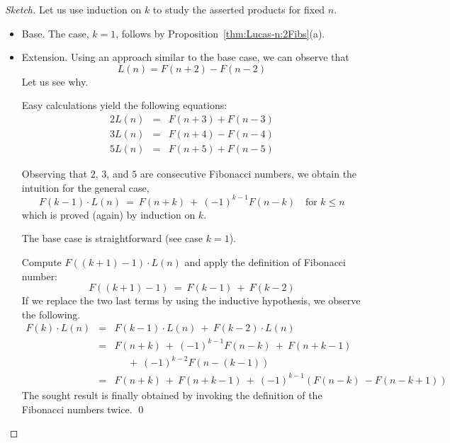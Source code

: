 \begin{proof}[Sketch]
Let us use induction on $k$ to study the asserted products for fixed $n$.
\begin{itemize}
\item
{\sf Base.} 
The case, $k=1$, follows by Proposition~\ref{thm:Lucas-n:2Fibs}(a).

\item
{\sf Extension.}
Using an approach similar to the base case, we can observe that
\[ L(n) = F(n+2)-F(n-2) \] 
Let us see why.

\smallskip

Easy calculations yield the following equations:
\begin{eqnarray*}
2 L(n) & = & F(n+3) + F(n-3) \\
3 L(n) & = & F(n+4) - F(n-4) \\
5 L(n) & = & F(n+5) + F(n-5)
\end{eqnarray*}
 
Observing that $2$, $3$, and $5$ are consecutive Fibonacci numbers, we obtain the intuition for the general case,
\[  F(k-1) \cdot L(n) \ = \ F(n+k) \ + \ (-1)^{k-1}F(n-k) \ \ \ \mbox{ for  } k \leq n \]
which is proved (again) by induction on $k$.

\smallskip

The base case is straightforward (see case $k=1$).

\smallskip

Compute $F((k+1)-1) \cdot L(n)$ and apply the definition of Fibonacci number:
\[ F((k+1)-1) \ = \ F(k-1) \ + \ F(k-2) \]
If we replace the two last terms by using the inductive hypothesis, we observe the following.
\begin{eqnarray*}
F(k) \cdot L(n) & = & F(k-1) \cdot L(n) \ + \ F(k-2) \cdot L(n) \\
                        & = & F(n+k) \ + \ (-1)^{k-1} F(n-k) \ + \ F(n+k-1) \\
                        &    & \ \ \ \ \ \ + \ (-1)^{k-2} F(n-(k-1)) \\
                        & = & F(n+k) \ + \ F(n+k-1) \ + \ (-1)^{k-1} (F(n-k) \ -  F(n-k+1))
\end{eqnarray*}
The sought result is finally obtained by invoking the definition of the Fibonacci numbers twice. \qed
\end{itemize}
\end{proof}

